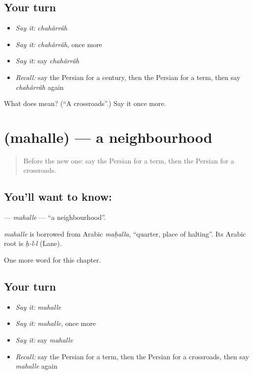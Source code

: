 \subsection*{Your turn}
\begin{itemize}
\raggedright
  \item \emph{Say it:} \emph{chahârrâh}
  \item \emph{Say it:} \emph{chahârrâh}, once more
  \item \emph{Say it:} say \emph{chahârrâh}
  \item \emph{Recall:} say the Persian for a century, then the Persian for a term, then say \emph{chahârrâh} again
\end{itemize}

\begin{tcolorbox}[breakable,colback=teal!4,colframe=teal!35!black,title={Before you move on}]
What does  mean? (\textquotedblleft{}A crossroads\textquotedblright{}.) Say it once more.
\end{tcolorbox}
\section[\texorpdfstring{\fa{محله} (mahalle)}{محله (mahalle)}]{ (mahalle) — a neighbourhood}

\label{lesson:FA-C266-mahalle}



\begin{quote}
Before the new one: say the Persian for a term, then the Persian for a crossroads.
\end{quote}

\subsection*{You'll want to know: }
\textbf{} — \emph{mahalle} — \textquotedblleft{}a neighbourhood\textquotedblright{}.

\begin{cousinweb}
\emph{mahalle} is borrowed from Arabic \emph{maḥalla}, \textquotedblleft{}quarter, place of halting\textquotedblright{}. Its Arabic root is \emph{ḥ-l-l} (Lane).
\end{cousinweb}

\begin{grammarlens}[title={What you've built}]
One more word for this chapter.
\end{grammarlens}

\subsection*{Your turn}
\begin{itemize}
\raggedright
  \item \emph{Say it:} \emph{mahalle}
  \item \emph{Say it:} \emph{mahalle}, once more
  \item \emph{Say it:} say \emph{mahalle}
  \item \emph{Recall:} say the Persian for a term, then the Persian for a crossroads, then say \emph{mahalle} again
\end{itemize}

